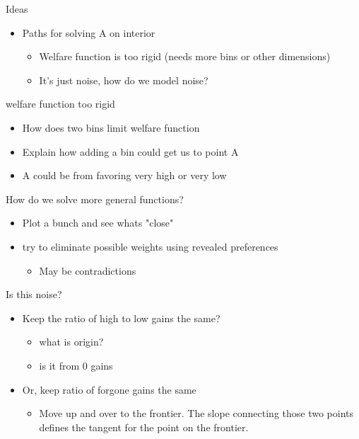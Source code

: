 \documentclass[t,aspectratio=169,11pt,presentation]{beamer}
\begin{document}


\begin{frame}{Ideas}
    \begin{itemize}
        \item Paths for solving A on interior 
        \begin{itemize}
            \item Welfare function is too rigid (needs more bins or other dimensions) 
            \item It's just noise, how do we model noise? 
        \end{itemize}
    \end{itemize}
\end{frame}



\begin{frame}{welfare function too rigid}

\begin{itemize}
    \item How does two bins limit welfare function 
    \item Explain how adding a bin could get us to point A 
    \item A could be from favoring very high or very low 
\end{itemize}    
\end{frame}


\begin{frame}{How do we solve more general functions? }
\begin{itemize}
    \item Plot a bunch and see whats "close" 
    \item try to eliminate possible weights using revealed preferences 
    \begin{itemize}
        \item May be contradictions 
    \end{itemize}
\end{itemize}    
\end{frame}


\begin{frame}{Is this noise? }
\begin{itemize}
   \item Keep the ratio of high to low gains the same? 
   \begin{itemize}
       \item what is origin? 
       \item is it from 0 gains
   \end{itemize}
   
   \item Or, keep ratio of forgone gains the same
   \begin{itemize}
       \item Move up and over to the frontier. The slope connecting those two points defines the tangent for the point on the frontier. 
   \end{itemize}
\end{itemize}    
\end{frame}
\end{document}
